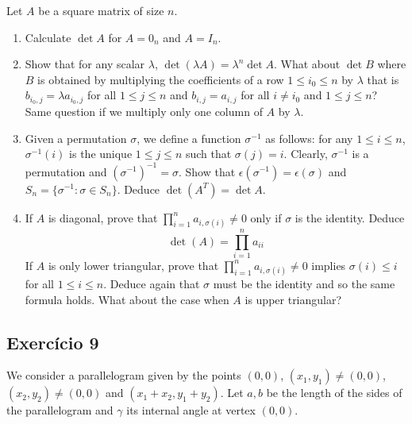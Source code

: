   Let $A$ be a square matrix of size $n$.
\begin{enumerate}
\item Calculate $\det A$ for $A = 0_n$ and $A=I_n$.
\item Show that for any scalar $\lambda$, $\det(\lambda A) = \lambda^n \det A$.
  What about $\det B$ where $B$ is obtained by multiplying the coefficients
  of a row $1 \leq i_0 \leq n$ by $\lambda$ that is
  $b_{i_0,j} = \lambda a_{i_0,j}$ for all $1 \leq j \leq n$ and
  $b_{i,j} = a_{i,j}$ for all $i \neq i_0$ and $1 \leq j \leq n$?
  Same question if we multiply only one column of $A$ by $\lambda$.
\item Given a permutation $\sigma$, we define a function $\sigma^{-1}$
  as follows: for any $1 \leq i \leq n$, $\sigma^{-1}(i)$ is the unique
  $1 \leq j \leq n$ such that $\sigma(j) = i$. Clearly, $\sigma^{-1}$ is a
  permutation and ${(\sigma^{-1})}^{-1} = \sigma$.
  Show that
  $\epsilon(\sigma^{-1}) = \epsilon(\sigma)$ and
  $S_n = \{ \sigma^{-1} : \sigma \in S_n \}$. Deduce $\det(A^T) = \det A$.
\item If $A$ is diagonal, prove that
  $\prod_{i=1}^n a_{i,\sigma(i)} \neq 0$ only if $\sigma$ is the identity. Deduce
  $$ \det(A) = \prod_{i=1}^n a_{ii}$$
  If $A$ is only lower triangular, prove that
  $\prod_{i=1}^n a_{i,\sigma(i)} \neq 0$ implies $\sigma(i) \leq i$
  for all $1 \leq i \leq n$. Deduce again that $\sigma$ must be the identity
  and so the same formula holds.
  What about the case when $A$ is upper triangular?
\end{enumerate}

\subsection*{Exercício 9}
We consider a parallelogram given by the points $(0,0)$, $(x_1, y_1)
\neq (0,0)$,
$(x_2,y_2) \neq (0,0)$ and
$(x_1+x_2, y_1+y_2)$. Let $a, b$ be the length of the sides of
the parallelogram and $\gamma$ its internal angle at vertex $(0,0)$.

